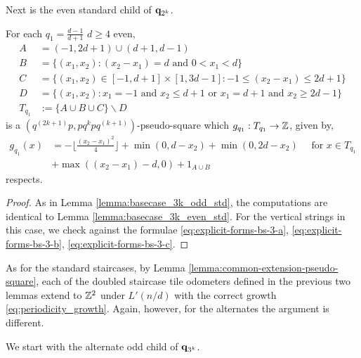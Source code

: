 \documentclass[12pt]{amsart}
\begin{document}
Next is the even standard child of $\mathbf{q}_{2^k}$. 
\begin{lemma}\label{lemma:basecase_2k_even_std}
For each $q_1 = \frac{d-1}{d+1}$ $d \geq 4$ even, 
\begin{align*}
A &=  (-1,2d+1) \cup (d+1,d-1) \\
B &= \{ (x_1, x_2) : (x_2-x_1) = d \mbox{ and } 0 < x_1 < d\} \\
C &=  \{ (x_1, x_2) \in [-1, d+1] \times [1, 3d-1] : -1 \leq (x_2 -x_1) \leq 2d + 1\} \\ 
D &= \{ (x_1, x_2) : x_1 = -1 \mbox{ and } x_2 \leq d+1 \mbox{ or } x_1 = d+1 \mbox{ and } x_2 \geq 2d-1 \}  \\
T_{q_1} &:=  \{A \cup B \cup C \} \backslash D
\end{align*}
is a $(q^{(2k+1)} p, p q^k p q^{(k+1)})$-pseudo-square which $g_{q_1}:T_{q_1} \to \mathbb{Z}$, given by,
\[
\begin{aligned}
g_{q_1}(x) &= -\lfloor \frac{(x_2-x_1)^2}{4} \rfloor + \min(0, d-x_2) + \min(0, 2d-x_2) \quad \mbox{ for $x \in T_{q_1}$} \\
&+ \max((x_2-x_1)-d,0) + 1_{A \cup B}
\end{aligned}
\]
respects. 
\end{lemma}
\begin{proof}
	As in Lemma \ref{lemma:basecase_3k_odd_std}, the computations are identical to Lemma \ref{lemma:basecase_3k_even_std}. 
	For the vertical strings in this case, we check against the formulae \eqref{eq:explicit-forms-bs-3-a}, \eqref{eq:explicit-forms-bs-3-b}, \eqref{eq:explicit-forms-bs-3-c}.
\end{proof}

As for the standard staircases, by Lemma \ref{lemma:common-extension-pseudo-square}, each of the doubled staircase tile odometers defined in the previous two lemmas extend to $\mathbb{Z}^2$ under $L'(n/d)$ with the correct growth \eqref{eq:periodicity_growth}. Again, however, for the alternates the argument is different.

We start with the alternate odd child of $\mathbf{q}_{3^k}$.
\end{document}
